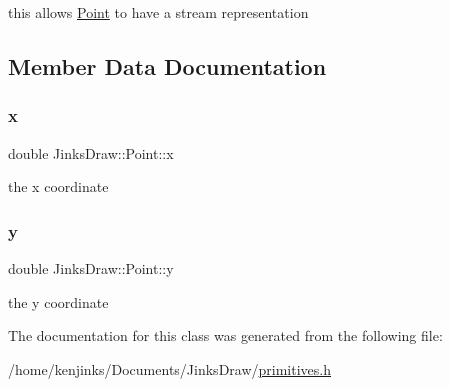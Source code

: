 this allows \mbox{\hyperlink{class_jinks_draw_1_1_point}{Point}} to have a stream representation 


\begin{DoxyCode}{0}
\end{DoxyCode}
 

\subsection{Member Data Documentation}
\mbox{\label{class_jinks_draw_1_1_point_a49a46c3d78c0c68260d55dacdee458de}} 
\subsubsection{\texorpdfstring{x}{x}}
{\footnotesize\ttfamily double Jinks\+Draw\+::\+Point\+::x\hspace{0.3cm}{\ttfamily [private]}}



the x coordinate 

\mbox{\label{class_jinks_draw_1_1_point_ad2dbfbd07baf41cfe82737a4f347bab5}} 
\subsubsection{\texorpdfstring{y}{y}}
{\footnotesize\ttfamily double Jinks\+Draw\+::\+Point\+::y\hspace{0.3cm}{\ttfamily [private]}}



the y coordinate 



The documentation for this class was generated from the following file\+:\begin{DoxyCompactItemize}
\item 
/home/kenjinks/\+Documents/\+Jinks\+Draw/\mbox{\hyperlink{primitives_8h}{primitives.\+h}}\end{DoxyCompactItemize}
